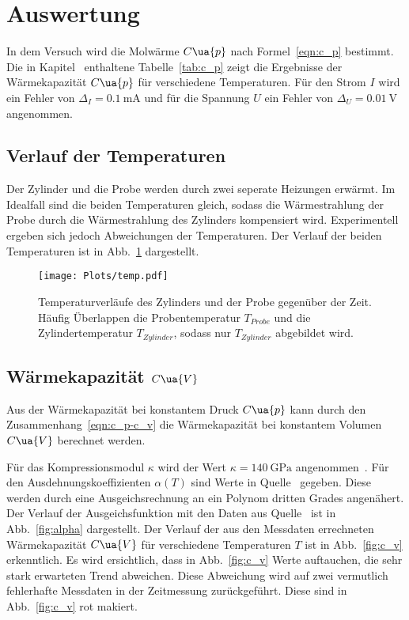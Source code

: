 \section{Auswertung}
\label{sec:auswertung}

In dem Versuch wird die Molwärme $C\ua{p}$ nach Formel~\eqref{eqn:c_p}
bestimmt. Die in Kapitel~\label{sec:wärmekapazität} enthaltene Tabelle~\ref{tab:c_p}
zeigt die Ergebnisse der Wärmekapazität $C\ua{p}$ für verschiedene Temperaturen.
Für den Strom $I$ wird ein Fehler von $\Delta_I = \SI{0.1}{\milli\ampere}$ und
für die Spannung $U$ ein Fehler von $\Delta_U = \SI{0.01}{\volt}$ angenommen.

\subsection{Verlauf der Temperaturen}

Der Zylinder und die Probe werden durch zwei seperate Heizungen erwärmt.
Im Idealfall sind die beiden Temperaturen gleich, sodass die Wärmestrahlung der
Probe durch die Wärmestrahlung des Zylinders kompensiert wird. Experimentell ergeben
sich jedoch Abweichungen der Temperaturen.
Der Verlauf der beiden Temperaturen ist in Abb.~\ref{fig:temp}
dargestellt.

\begin{figure}
  \centering
  \texttt{[image: Plots/temp.pdf]}
  \caption{Temperaturverläufe des Zylinders und der Probe gegenüber der Zeit.
  Häufig Überlappen die Probentemperatur $T_{Probe}$ und die Zylindertemperatur $T_{Zylinder}$,
  sodass nur $T_{Zylinder}$ abgebildet wird.}
  \label{fig:temp}
\end{figure}


\subsection{Wärmekapazität $C\ua{V}$}
\label{sec:wärmekapazität}

Aus der Wärmekapazität bei konstantem Druck $C\ua{p}$ kann
durch den Zusammenhang~\eqref{eqn:c_p-c_v} die Wärmekapazität bei
konstantem Volumen $C\ua{V}$ berechnet werden.

Für das Kompressionsmodul $\kappa$ wird der Wert $\kappa = \SI{140}{\giga\pascal}$
angenommen~\cite{kompression}.
Für den Ausdehnungskoeffizienten $\alpha(T)$ sind Werte in Quelle~\cite{anleitung}
gegeben. Diese werden durch eine Ausgeichsrechnung an ein Polynom dritten Grades
angenähert. Der Verlauf der Ausgeichsfunktion mit den Daten aus Quelle~\cite{anleitung}
ist in Abb.~\ref{fig:alpha} dargestellt.
Der Verlauf der aus den Messdaten errechneten Wärmekapazität $C\ua{V}$
für verschiedene Temperaturen $T$ ist in Abb.~\ref{fig:c_v} erkenntlich.
Es wird ersichtlich, dass in Abb.~\ref{fig:c_v} Werte auftauchen, die sehr
stark erwarteten Trend abweichen.
Diese Abweichung wird auf zwei vermutlich fehlerhafte Messdaten in der Zeitmessung zurückgeführt.
Diese sind in Abb.~\ref{fig:c_v} rot makiert.

